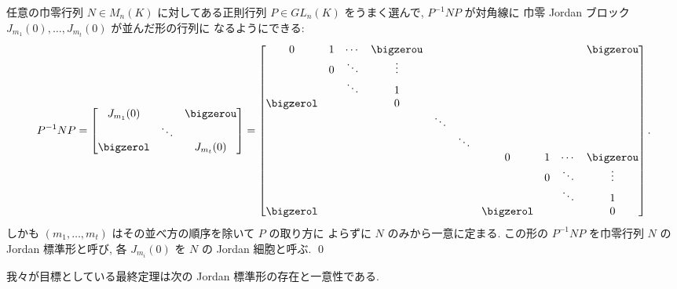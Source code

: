 \documentclass[12pt,twoside]{jarticle}
\begin{document}
\begin{theorem}[巾零行列の標準形]
\label{theorem:nilpotent-normal-form}
  任意の巾零行列 $N\in M_n(K)$ に対してある正則行列 $P\in GL_n(K)$ 
  をうまく選んで, $P^{-1}NP$ が対角線に
  巾零 Jordan ブロック $J_{m_1}(0),\dots,J_{m_t}(0)$ が並んだ形の行列に
  なるようにできる:
  {\small
  \begin{equation*}
    P^{-1}NP =
    \begin{bmatrix}
      J_{m_1}(0) &        & \bigzerou \\
                 & \ddots & \\
      \bigzerol  &        & J_{m_t}(0) \\
    \end{bmatrix}
    =
    \begin{bmatrix}
      0         & 1        & \cdots & \bigzerou & & & & & & \bigzerou \\
                & 0        & \ddots & \vdots    & & & & & & \\
                &          & \ddots & 1         & & & & & & \\
      \bigzerol &          &        & 0         & & & & & & \\
                & & & & \ddots & & & & \\
                & & & & & \ddots & & & \\
                & & & & & & 0         & 1        & \cdots & \bigzerou \\
                & & & & & &           & 0        & \ddots & \vdots \\
                & & & & & &           &          & \ddots & 1 \\
      \bigzerol & & & & & & \bigzerol &          &        & 0 \\
    \end{bmatrix}.
  \end{equation*}
  }しかも $(m_1,\dots,m_t)$ はその並べ方の順序を除いて $P$ の取り方に
  よらずに $N$ のみから一意に定まる.
  この形の $P^{-1}NP$ を巾零行列 $N$ の Jordan 標準形と呼び, 
  各 $J_{m_i}(0)$ を $N$ の Jordan 細胞と呼ぶ.
  \qed
\end{theorem}


我々が目標としている最終定理は次の Jordan 標準形の存在と一意性である.
\end{document}
